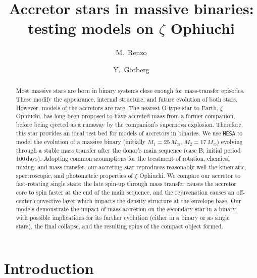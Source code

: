 \documentclass[twocolumn,twocolappendix,trackchanges]{aastex63}
\begin{document}
\graphicspath{{./figures/}}


\title{Accretor stars in massive binaries: testing models on  $\zeta$ Ophiuchi}

\author[0000-0002-6718-9472]{M.~Renzo}

\author[0000-0002-6960-6911]{Y.~G\"otberg}


\begin{abstract}
  Most massive stars are born in binary systems close enough
  for mass-transfer episodes. These modify the appearance, internal
  structure, and future evolution of both stars. However,
  models of the accretors are rare.  The nearest
  O-type star to Earth, $\zeta$ Ophiuchi, has long been
  proposed to have accreted mass from a former companion, before being
  ejected as a runaway by the companion's supernova
  explosion. Therefore, this star provides an ideal test bed for
  models of accretors in binaries. We use %
  \texttt{MESA} to model the evolution of a massive binary (initially
  $M_1=25\,M_\odot$, $M_2=17\,M_\odot$) evolving through a stable mass
  transfer after the donor's main sequence (case B, initial period
  100\,days). Adopting common assumptions for the treatment of
  rotation, chemical mixing, and mass transfer, our accreting star
  reproduces reasonably well the kinematic, spectroscopic, and
  photometric properties of $\zeta$ Ophiuchi. We compare our accretor
  to fast-rotating single stars: the late spin-up through
  mass transfer causes the accretor core to spin faster at the end of
  the main sequence, and the rejuvenation causes an off-center
  convective layer which impacts the density structure at the envelope base.
  Our models demonstrate the impact of
  mass accretion on the secondary star in a binary, with possible
  implications for its further evolution (either in a binary or as
  single stars), the final collapse, and the resulting spins of the
  compact object formed.
\end{abstract}

\vspace*{-10pt}

\section{Introduction}
\label{sec:intro}
\end{document}
